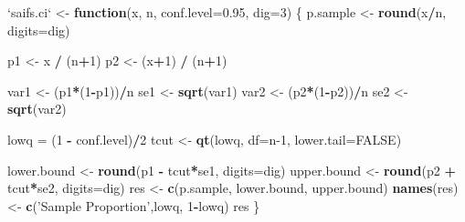 \documentclass[
]{book}
\newenvironment{Shaded}{\begin{snugshade}}{\end{snugshade}}
\newcommand{\ControlFlowTok}[1]{\textcolor[rgb]{0.13,0.29,0.53}{\textbf{#1}}}
\newcommand{\DataTypeTok}[1]{\textcolor[rgb]{0.13,0.29,0.53}{#1}}
\newcommand{\DecValTok}[1]{\textcolor[rgb]{0.00,0.00,0.81}{#1}}
\newcommand{\FloatTok}[1]{\textcolor[rgb]{0.00,0.00,0.81}{#1}}
\newcommand{\KeywordTok}[1]{\textcolor[rgb]{0.13,0.29,0.53}{\textbf{#1}}}
\newcommand{\NormalTok}[1]{#1}
\newcommand{\OperatorTok}[1]{\textcolor[rgb]{0.81,0.36,0.00}{\textbf{#1}}}
\newcommand{\OtherTok}[1]{\textcolor[rgb]{0.56,0.35,0.01}{#1}}
\newcommand{\StringTok}[1]{\textcolor[rgb]{0.31,0.60,0.02}{#1}}
\begin{document}
\begin{Shaded}
\begin{Highlighting}[]
\StringTok{`}\DataTypeTok{saifs.ci}\StringTok{`}\NormalTok{ <-}\StringTok{ }
\StringTok{  }\ControlFlowTok{function}\NormalTok{(x, n, }\DataTypeTok{conf.level=}\FloatTok{0.95}\NormalTok{, }\DataTypeTok{dig=}\DecValTok{3}\NormalTok{)}
\NormalTok{  \{}
\NormalTok{    p.sample <-}\StringTok{ }\KeywordTok{round}\NormalTok{(x}\OperatorTok{/}\NormalTok{n, }\DataTypeTok{digits=}\NormalTok{dig)}
    
\NormalTok{    p1 <-}\StringTok{ }\NormalTok{x }\OperatorTok{/}\StringTok{ }\NormalTok{(n}\OperatorTok{+}\DecValTok{1}\NormalTok{)}
\NormalTok{    p2 <-}\StringTok{ }\NormalTok{(x}\OperatorTok{+}\DecValTok{1}\NormalTok{) }\OperatorTok{/}\StringTok{ }\NormalTok{(n}\OperatorTok{+}\DecValTok{1}\NormalTok{)}
    
\NormalTok{    var1 <-}\StringTok{ }\NormalTok{(p1}\OperatorTok{*}\NormalTok{(}\DecValTok{1}\OperatorTok{-}\NormalTok{p1))}\OperatorTok{/}\NormalTok{n}
\NormalTok{    se1 <-}\StringTok{ }\KeywordTok{sqrt}\NormalTok{(var1)}
\NormalTok{    var2 <-}\StringTok{ }\NormalTok{(p2}\OperatorTok{*}\NormalTok{(}\DecValTok{1}\OperatorTok{-}\NormalTok{p2))}\OperatorTok{/}\NormalTok{n}
\NormalTok{    se2 <-}\StringTok{ }\KeywordTok{sqrt}\NormalTok{(var2)}
    
\NormalTok{    lowq =}\StringTok{ }\NormalTok{(}\DecValTok{1} \OperatorTok{-}\StringTok{ }\NormalTok{conf.level)}\OperatorTok{/}\DecValTok{2}
\NormalTok{    tcut <-}\StringTok{ }\KeywordTok{qt}\NormalTok{(lowq, }\DataTypeTok{df=}\NormalTok{n}\DecValTok{-1}\NormalTok{, }\DataTypeTok{lower.tail=}\OtherTok{FALSE}\NormalTok{)}
    
\NormalTok{    lower.bound <-}\StringTok{ }\KeywordTok{round}\NormalTok{(p1 }\OperatorTok{-}\StringTok{ }\NormalTok{tcut}\OperatorTok{*}\NormalTok{se1, }\DataTypeTok{digits=}\NormalTok{dig)}
\NormalTok{    upper.bound <-}\StringTok{ }\KeywordTok{round}\NormalTok{(p2 }\OperatorTok{+}\StringTok{ }\NormalTok{tcut}\OperatorTok{*}\NormalTok{se2, }\DataTypeTok{digits=}\NormalTok{dig)}
\NormalTok{    res <-}\StringTok{ }\KeywordTok{c}\NormalTok{(p.sample, lower.bound, upper.bound)}
    \KeywordTok{names}\NormalTok{(res) <-}\StringTok{ }\KeywordTok{c}\NormalTok{(}\StringTok{'Sample Proportion'}\NormalTok{,lowq, }\DecValTok{1}\OperatorTok{-}\NormalTok{lowq)}
\NormalTok{    res}
\NormalTok{  \}}
\end{Highlighting}
\end{Shaded}
\end{document}
